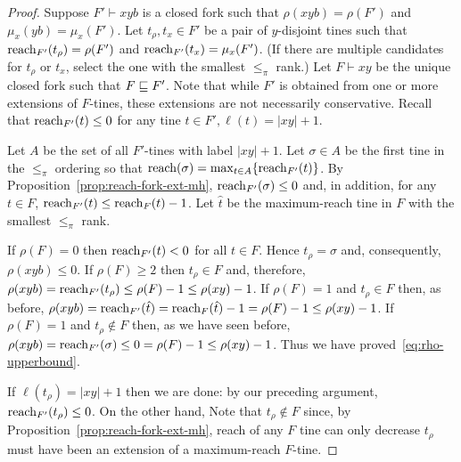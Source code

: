 \begin{proof}
  Suppose $F'\vdash xyb$ is a closed fork such that 
  $\rho(xyb)=\rho(F')$ and $\mu_x(yb)=\mu_x(F')$. 
  Let $t_\rho, t_x \in F'$ be a pair of $y$-disjoint tines such that $\operatorname{reach}_{F'}(t_\rho)=\rho(F')$ and $\operatorname{reach}_{F'}(t_x)=\mu_x(F')$. 
  (If there are multiple candidates for $t_\rho$ or $t_x$, 
  select the one with the smallest $\leq_\pi$ rank.)
  Let $F\vdash xy$ be the unique closed fork such that $F\sqsubseteq F'$.  
  Note that while $F'$ is obtained from one or more extensions 
  of $F$-tines, 
  these extensions are not necessarily conservative. 
  Recall that $\operatorname{reach}_{F'}(t) \leq 0$ for any tine $t \in F', \ell(t) = |xy| + 1$.

  Let $A$ be the set of all $F'$-tines with label $|xy| + 1$.
  Let $\sigma \in A$ be the first tine in the $\leq_\pi$ ordering so that $\operatorname{reach}(\sigma) = \max_{t \in A}\{\operatorname{reach}_{F'}(t)\}$.
  By Proposition~\ref{prop:reach-fork-ext-mh}, 
  $\operatorname{reach}_{F'}(\sigma) \leq 0$ and, 
  in addition, for any $t \in F$, 
  $\operatorname{reach}_{F'}(t) \leq \operatorname{reach}_F(t) - 1$.   
  Let $\hat{t}$ be the maximum-reach tine in $F$ 
  with the smallest $\leq_\pi$ rank.

  If $\rho(F) = 0$ then 
  $\operatorname{reach}_{F'}(t) < 0$ for all $t \in F$. 
  Hence $t_\rho = \sigma$ and, consequently, 
  $\rho(xyb) \leq 0$. 
  If $\rho(F) \geq 2$ then $t_\rho \in F$
  and, therefore, 
  $\rho(xyb) = \operatorname{reach}_{F'}(t_\rho) \leq \rho(F) - 1 \leq \rho(xy) - 1$. 
  If $\rho(F) = 1$ and $t_\rho \in F$ then, 
  as before, 
  $\rho(xyb) = \operatorname{reach}_{F'}(\hat{t}) = \operatorname{reach}_{F}(\hat{t}) - 1 = \rho(F) - 1 \leq \rho(xy) - 1$.
  If $\rho(F) = 1$ and $t_\rho \not \in F$ then, as we have seen before, 
  $\rho(xyb) = \operatorname{reach}_{F'}(\sigma) \leq 0 = \rho(F) - 1\leq \rho(xy) - 1$.
  Thus we have proved~\eqref{eq:rho-upperbound}.


  If $\ell(t_\rho) = |xy| + 1$ then we are done: 
  by our preceding argument, $\operatorname{reach}_{F'}(t_\rho) \leq 0$. 
  On the other hand, 
  Note that $t_\rho \not \in F$ since, by Proposition~\ref{prop:reach-fork-ext-mh}, reach of any $F$ tine can only decrease
  $t_\rho$ must have been an extension of a maximum-reach $F$-tine.


\end{proof}
